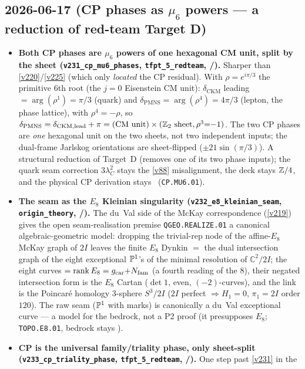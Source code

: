 \subsection*{2026-06-17 (CP phases as $\mu_6$ powers --- a reduction of red-team Target D)}
\begin{itemize}
\item \textbf{Both CP phases are $\mu_6$ powers of one hexagonal CM unit, split by the sheet
  (\texttt{v231\_cp\_mu6\_phases}, \texttt{tfpt\_5\_redteam}, \mE/\mC).} Sharper than \vref{v220}/\vref{v225}
  (which only \emph{located} the CP residual). With $\rho=e^{i\pi/3}$ the primitive $6$th root (the $j{=}0$
  Eisenstein CM unit): $\delta_{\mathrm{CKM}}$ leading $=\arg(\rho^1)=\pi/3$ (quark) and
  $\delta_{\mathrm{PMNS}}=\arg(\rho^4)=4\pi/3$ (lepton, the phase lattice), with $\rho^4=-\rho$, so
  $\delta_{\mathrm{PMNS}}=\delta_{\mathrm{CKM,lead}}+\pi=(\text{CM unit})\times(\mathbb{Z}_2\text{ sheet}, \rho^3{=}{-}1)$.
  The two CP phases are \emph{one} hexagonal unit on the two sheets, not two independent inputs; the
  dual-frame Jarlskog orientations are sheet-flipped ($\pm21\sin(\pi/3)$). A structural reduction of Target~D
  (removes one of its two phase inputs); the quark seam correction $3\lambda_C^2$ stays the \vref{v88}
  misalignment, the deck stays $\mathbb{Z}/4$, and the physical CP derivation stays \mC\ (\texttt{CP.MU6.01}).
\item \textbf{The seam as the $E_8$ Kleinian singularity (\texttt{v232\_e8\_kleinian\_seam},
  \texttt{origin\_theory}, \mE/\mC).} The du~Val side of the McKay correspondence (\vref{v219}) gives the
  open seam-realisation premise \texttt{QGEO.REALIZE.01} a canonical algebraic-geometric model: dropping the
  trivial-rep node of the affine-$E_8$ McKay graph of $2I$ leaves the finite $E_8$ Dynkin $=$ the dual
  intersection graph of the eight exceptional $\mathbb{P}^1$'s of the minimal resolution of $\mathbb C^2/2I$; the
  eight curves $=\operatorname{rank}E_8=g_{\mathrm{car}}{+}N_{\mathrm{fam}}$ (a fourth reading of the $8$), their negated
  intersection form is the $E_8$ Cartan ($\det1$, even, $(-2)$-curves), and the link is the Poincar\'e
  homology $3$-sphere $S^3/2I$ ($2I$ perfect $\Rightarrow H_1{=}0$, $\pi_1{=}2I$ order $120$). The raw seam
  ($\mathbb{P}^1$ with marks)   is canonically a du~Val exceptional curve --- a model for the bedrock, not a P2 proof
  (it presupposes $E_8$; \texttt{TOPO.E8.01}, bedrock stays \mO).
\item \textbf{CP is the universal family/triality phase, only sheet-split
  (\texttt{v233\_cp\_triality\_phase}, \texttt{tfpt\_5\_redteam}, \mE/\mC).} One step past \vref{v231} in the

\end{itemize}
